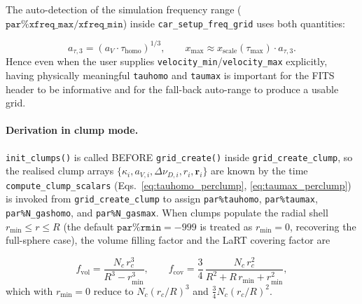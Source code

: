 \documentclass[english,a4paper]{my_memo}
\begin{document}
\begin{sloppypar}
The auto-detection of the simulation frequency range
($\texttt{par\%xfreq\_max}/\texttt{xfreq\_min}$) inside
\texttt{car\_setup\_freq\_grid} uses both quantities:
\end{sloppypar}
\begin{equation}
  a_{\tau,3} = \left(a_V \cdot \tau_\mathrm{homo}\right)^{1/3},\qquad
  x_\mathrm{max} \approx x_\mathrm{scale}(\tau_\mathrm{max}) \cdot a_{\tau,3}.
\end{equation}
Hence even when the user supplies \texttt{velocity\_min}/\texttt{velocity\_max}
explicitly, having physically meaningful \texttt{tauhomo} and \texttt{taumax}
is important for the FITS header to be informative and for the
fall-back auto-range to produce a usable grid.

\paragraph{Derivation in clump mode.}
\begin{sloppypar}
\texttt{init\_clumps()} is called BEFORE \texttt{grid\_create()} inside
\texttt{grid\_create\_clump}, so the realised clump arrays
$\{\kappa_i, a_{V,i}, \Delta\nu_{D,i}, r_i, \mathbf{r}_i\}$ are known by
the time \texttt{compute\_clump\_scalars} (Eqs.~\ref{eq:tauhomo_perclump},
\ref{eq:taumax_perclump}) is invoked from \texttt{grid\_create\_clump} to
assign \texttt{par\%tauhomo}, \texttt{par\%taumax},
\texttt{par\%N\_gashomo}, and \texttt{par\%N\_gasmax}.  When clumps
populate the radial shell $r_\mathrm{min} \le r \le R$ (the default
$\texttt{par\%rmin} = -999$ is treated as $r_\mathrm{min}=0$, recovering
the full-sphere case), the volume filling factor and the LaRT covering
factor are
\end{sloppypar}
\begin{equation}
  f_\mathrm{vol} = \frac{N_c\,r_c^3}{R^3 - r_\mathrm{min}^3},\qquad
  f_\mathrm{cov} = \frac{3}{4}\,
                   \frac{N_c\,r_c^2}{R^2 + R\,r_\mathrm{min} + r_\mathrm{min}^2},
\label{eq:fvol_fcov_shell}
\end{equation}
which with $r_\mathrm{min} = 0$ reduce to $N_c (r_c/R)^3$ and
$\tfrac{3}{4} N_c (r_c/R)^2$.
\end{document}
